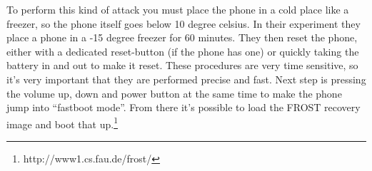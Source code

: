 To perform this kind of attack you must place the phone in a cold place like a 
freezer, so the phone itself goes below 10 degree celsius. In their experiment 
they place a phone in a -15 degree freezer for 60 minutes. They then reset the 
phone, either with a dedicated reset-button (if the phone has one) or quickly 
taking the battery in and out to make it reset. These procedures are very time 
sensitive, so it’s very important that they are performed precise and fast. 
Next step is pressing the volume up, down and power button at the same time to 
make the phone jump into “fastboot mode”. From there it’s possible to load the 
FROST recovery image and boot that up.\footnote{http://www1.cs.fau.de/frost/}
